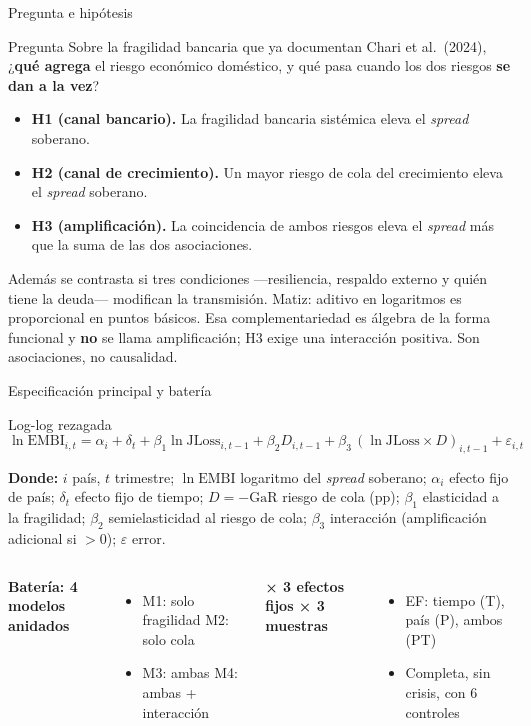 \documentclass[aspectratio=169]{beamer}
\newcommand{\JLoss}{\mathrm{JLoss}}
\newcommand{\GaR}{\mathrm{GaR}}
\newcommand{\EMBI}{\mathrm{EMBI}}
\begin{document}
\begin{frame}{Pregunta e hipótesis}
\begin{block}{Pregunta}
Sobre la fragilidad bancaria que ya documentan Chari et al.\ (2024), ¿\textbf{qué agrega} el riesgo económico doméstico, y qué pasa cuando los dos riesgos \textbf{se dan a la vez}?
\end{block}
\vspace{4pt}
\begin{itemize}
\item \textbf{H1 (canal bancario).} La fragilidad bancaria sistémica eleva el \textit{spread} soberano.
\item \textbf{H2 (canal de crecimiento).} Un mayor riesgo de cola del crecimiento eleva el \textit{spread} soberano.
\item \textbf{H3 (amplificación).} La coincidencia de ambos riesgos eleva el \textit{spread} más que la suma de las dos asociaciones.
\end{itemize}
Además se contrasta si tres condiciones ---resiliencia, respaldo externo y quién tiene la deuda--- modifican la transmisión.
\vspace{4pt}
\footnotesize Matiz: aditivo en logaritmos es proporcional en puntos básicos. Esa complementariedad es álgebra de la forma funcional y \textbf{no} se llama amplificación; H3 exige una interacción positiva. Son asociaciones, no causalidad.
\end{frame}

\begin{frame}{Especificación principal y batería}
\begin{block}{Log-log rezagada}
\vspace{-6pt}
\[
\ln\EMBI_{i,t}=\alpha_i+\delta_t+\beta_1\ln\JLoss_{i,t-1}+\beta_2D_{i,t-1}+\beta_3\,(\ln\JLoss\times D)_{i,t-1}+\varepsilon_{i,t}
\]
\vspace{-8pt}
\end{block}
{\scriptsize \textbf{Donde:} $i$ país, $t$ trimestre; $\ln\EMBI$ logaritmo del \textit{spread} soberano; $\alpha_i$ efecto fijo de país; $\delta_t$ efecto fijo de tiempo; $D=-\GaR$ riesgo de cola (pp); $\beta_1$ elasticidad a la fragilidad; $\beta_2$ semielasticidad al riesgo de cola; $\beta_3$ interacción (amplificación adicional si $>0$); $\varepsilon$ error.\par}
\vspace{4pt}
\begin{columns}[T]
\small
\textbf{Batería: 4 modelos anidados}
\begin{itemize}
\item M1: solo fragilidad \quad M2: solo cola
\item M3: ambas \quad M4: ambas + interacción
\end{itemize}
\small
\textbf{× 3 efectos fijos × 3 muestras}
\begin{itemize}
\item EF: tiempo (T), país (P), ambos (PT)
\item Completa, sin crisis, con 6 controles
\end{itemize}
\end{columns}
\end{frame}
\end{document}
